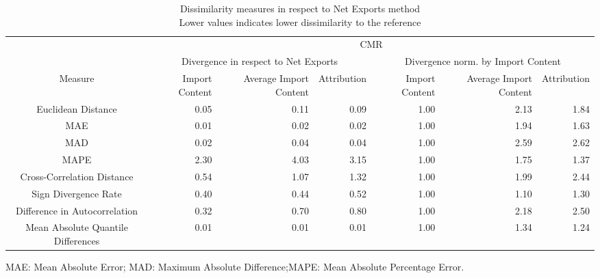 \begin{table}[t]
\caption*{
{\large Dissimilarity measures in respect to Net Exports method} \\ 
{\small Lower values indicates lower dissimilarity to the reference}
} 
\fontsize{15.0pt}{18.0pt}\selectfont
\begin{tabular*}{\linewidth}{@{\extracolsep{\fill}}crrrrrr}
\toprule
 & \multicolumn{6}{c}{CMR} \\ 
\cmidrule(lr){2-7}
 & \multicolumn{3}{c}{Divergence in respect to Net Exports} & \multicolumn{3}{c}{Divergence norm. by Import Content} \\ 
\cmidrule(lr){2-4} \cmidrule(lr){5-7}
Measure & Import Content & Average Import Content & Attribution & Import Content & Average Import Content & Attribution \\ 
\midrule\addlinespace[2.5pt]
Euclidean Distance & 0.05 & 0.11 & 0.09 & 1.00 & 2.13 & 1.84 \\ 
MAE & 0.01 & 0.02 & 0.02 & 1.00 & 1.94 & 1.63 \\ 
MAD & 0.02 & 0.04 & 0.04 & 1.00 & 2.59 & 2.62 \\ 
MAPE & 2.30 & 4.03 & 3.15 & 1.00 & 1.75 & 1.37 \\ 
Cross-Correlation Distance & 0.54 & 1.07 & 1.32 & 1.00 & 1.99 & 2.44 \\ 
Sign Divergence Rate & 0.40 & 0.44 & 0.52 & 1.00 & 1.10 & 1.30 \\ 
Difference in Autocorrelation & 0.32 & 0.70 & 0.80 & 1.00 & 2.18 & 2.50 \\ 
Mean Absolute Quantile Differences & 0.01 & 0.01 & 0.01 & 1.00 & 1.34 & 1.24 \\ 
\bottomrule
\end{tabular*}
\begin{minipage}{\linewidth}
MAE: Mean Absolute Error; MAD: Maximum Absolute Difference;MAPE: Mean Absolute Percentage Error.\\
\end{minipage}
\end{table}


